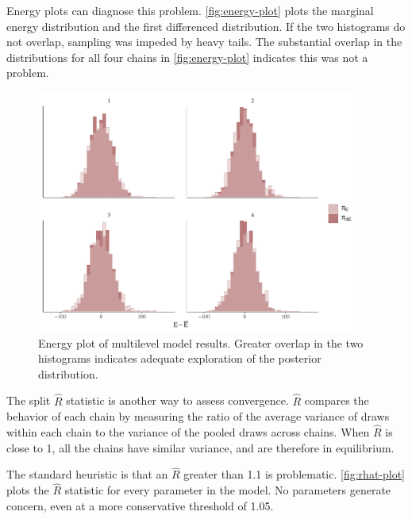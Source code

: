 \documentclass[12pt]{article}
\begin{document}
Energy plots can diagnose this problem. 
\autoref{fig:energy-plot} plots the marginal energy distribution and the first differenced distribution. 
If the two histograms do not overlap, sampling was impeded by heavy tails. 
The substantial overlap in the distributions for all four chains in \autoref{fig:energy-plot} indicates this was not a problem. 


\begin{figure}
	\centering
		\includegraphics[width=0.95\textwidth]{energy-plot.pdf}
	\caption{Energy plot of multilevel model results. Greater overlap in the two histograms indicates adequate exploration of the posterior distribution. }
	\label{fig:energy-plot}
\end{figure}


The split $\hat{R}$ statistic is another way to assess convergence. 
$\hat{R}$ compares the behavior of each chain by measuring the ratio of the average variance of draws within each chain to the variance of the pooled draws across chains. 
When $\hat{R}$ is close to 1, all the chains have similar variance, and are therefore in equilibrium. 


The standard heuristic is that an $\hat{R}$ greater than 1.1 is problematic. 
\autoref{fig:rhat-plot} plots the $\hat{R}$ statistic for every parameter in the model. 
No parameters generate concern, even at a more conservative threshold of 1.05. 
\end{document}
